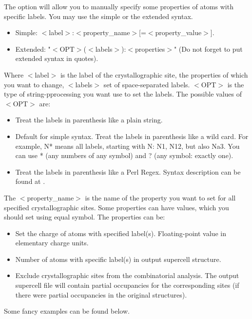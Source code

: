 \documentclass[a4paper,english]{article}
\begin{document}
\begin{Description}
\item[\OptArg{-p }{labels-properties}, \OptArg{\Dd property=}{labels-properties}]
      The option will allow you to manually specify some properties of atoms with specific labels. You may use the simple or the extended syntax.
       \begin{itemize}
         \item Simple: $<$label$>$:$<$property\_name$>$[=$<$property\_value$>$].
         \item Extended: "$<$OPT$>$($<$labels$>$):{$<$properties$>$}" (Do not forget to put extended syntax in quotes).
       \end{itemize}
       Where $<$label$>$ is the label of the crystallographic site, the properties of which you want to change, $<$labels$>$ set of space-separated labels. $<$OPT$>$ is the type of string-pprocessing you want use to set the labels. The possible values of $<$OPT$>$ are:
       \begin{itemize}
         \item[p] Treat the labels in parenthesis like a plain string. 
         \item[w, ""] Default for simple syntax. Treat the labels in parenthesis like a wild card. For example, N* means all labels, starting with N: N1, N12, but also Na3. You can use * (any numbers of any symbol) and ? (any symbol: exactly one).
         \item[r] Treat the labels in parenthesis like a Perl Regex. Syntax description can be found at .
       \end{itemize}
       The $<$property\_name$>$ is the name of the property you want to set for all specified crystallographic sites. Some properties can have values, which you should set using equal symbol. The properties can be:
       \begin{itemize}
         \item[c\Lbr charge\Rbr] Set the charge of atoms with specified label(s). Floating-point value in elementary charge units.
         \item[p\Lbr opulation\Rbr] Number of atoms with specific label(s) in output supercell structure.
         \item[\Lbr not\Rbr fixed] Exclude crystallographic sites from the combinatorial analysis. The output supercell file will contain partial occupancies for the corresponding sites (if there were partial occupancies in the original structures).
       \end{itemize}
       Some fancy examples can be found below.      
      

\end{Description}
\end{document}
